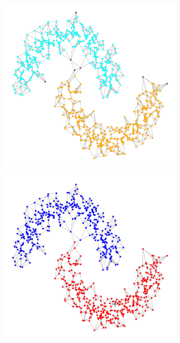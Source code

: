\documentclass{article}
\newcommand{\1}{\mathbf{1}}
\theoremstyle{aldenthm}
\theoremstyle{aldenrmrk}
\begin{document}
\begin{figure}
	\centering
	\begin{adjustbox}{minipage=\linewidth}
		\begin{subfigure}{.24\linewidth}
			\includegraphics[width=\linewidth,scale = .5]{example2plots/row1_true_density_cluster}
			\caption{}
		\end{subfigure}
		\begin{subfigure}{.24\linewidth}
			\includegraphics[width=\linewidth]{example2plots/row1_ppr_cluster}

\end{subfigure}
\end{adjustbox}
\end{figure}
\end{document}
